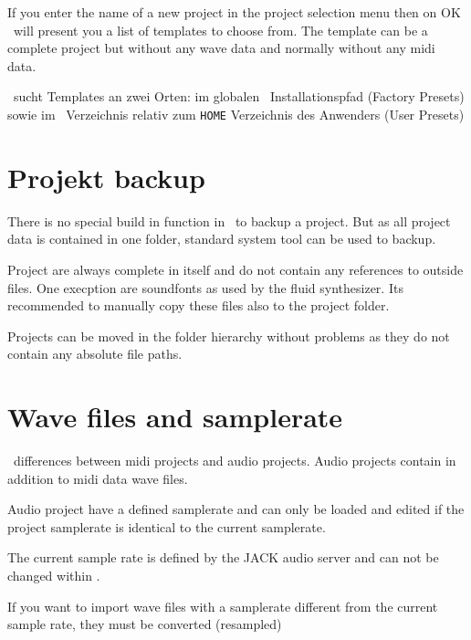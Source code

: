       If you enter the name of a new project in the project selection
      menu then on OK \M\ will present you a list of templates to
      choose from. The template can be a complete project but 
      without any wave data and normally without any midi data.

      \M\ sucht Templates an zwei Orten:
            im globalen \M\ Installationspfad (Factory Presets) sowie im 
                  \M\ Verzeichnis relativ zum {\tt HOME} Verzeichnis des
                        Anwenders (User Presets)

   \section{Projekt backup}

      There is no special build in function in \M\ to backup a project.
      But as all project data is contained in one folder, standard system
      tool can be used to backup.

      Project are always complete in itself and do not contain any 
      references to outside files. One execption are soundfonts 
      as used by the fluid  synthesizer. 
      Its recommended to manually copy these files also to the 
      project folder.

      Projects can be moved in the folder hierarchy without problems 
      as they do not contain any absolute file paths.

   \section{Wave files and samplerate}


      \M\ differences between midi projects and audio projects.
      Audio projects contain in addition to midi data wave files.
      
      Audio project have a defined samplerate and can only be loaded
      and edited if the project samplerate is identical to the
      current samplerate.

      The current sample rate is defined by the JACK audio server and
      can not be changed within \M.
                              
      If you want to import wave files with a samplerate different from
      the current sample rate, they must be converted 
      (resampled)
